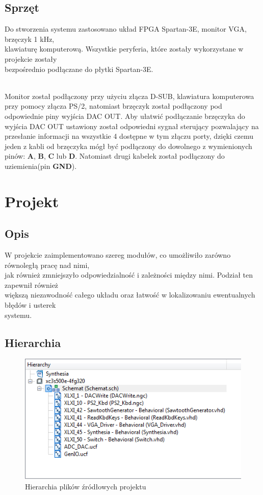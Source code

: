 \documentclass[a4paper]{report}
\begin{document}
	\section{Sprzęt}
		\par Do stworzenia systemu zastosowano układ FPGA Spartan-3E, 
		monitor VGA, brzęczyk 1 kHz, \\klawiaturę komputerową. Wszystkie peryferia, które zostały wykorzystane w projekcie
		zostały \\bezpośrednio podłączane do płytki Spartan-3E.\\\\
		\par Monitor został podłączony przy użyciu złącza D-SUB, 
		klawiatura komputerowa przy pomocy złącza PS/2, natomiast brzęczyk został podłączony pod odpowiednie piny wyjścia DAC OUT. Aby ułatwić 
		podłączanie brzęczyka do wyjścia DAC OUT ustawiony został odpowiedni sygnał sterujący pozwalający na przesłanie informacji na wszystkie 4 dostępne w tym 
		złączu porty, dzięki czemu jeden z kabli od brzęczyka mógł być podłączony do dowolnego z wymienionych pinów: \textbf{A},
		\textbf{B}, \textbf{C} lub \textbf{D}. Natomiast drugi kabelek został podłączony do uziemienia(pin \textbf{GND}).

\chapter{Projekt}
	\section{Opis}
	W projekcie zaimplementowano szereg modułów, co umożliwiło zarówno równoległą pracę nad nimi, \\jak również zmniejszyło odpowiedzialność i zależności między nimi. 
	Podział ten zapewnił również \\większą
	niezawodność całego układu oraz łatwość w lokalizowaniu ewentualnych błędów i 
	usterek \\systemu.
	\section{Hierarchia}
		\begin{figure}[h!]
			\centering
			\includegraphics{hierarchy.png}
			\caption{Hierarchia plików źródłowych projektu}
		\end{figure}
				
\end{document}
